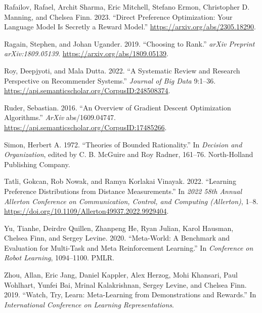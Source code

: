 \documentclass[
  letterpaper,
  DIV=11,
  numbers=noendperiod,
  oneside]{scrreprt}
\newlength{\cslhangindent}
\newenvironment{CSLReferences}[2] %
 {\begin{list}{}{%
  \setlength{\itemindent}{0pt}
  \setlength{\leftmargin}{0pt}
  \setlength{\parsep}{0pt}
  \ifodd #1
   \setlength{\leftmargin}{\cslhangindent}
   \setlength{\itemindent}{-1\cslhangindent}
  \fi
  \setlength{\itemsep}{#2\baselineskip}}}
 {\end{list}}
\theoremstyle{remark}
\begin{document}
\begin{CSLReferences}{1}{0}
Rafailov, Rafael, Archit Sharma, Eric Mitchell, Stefano Ermon,
Christopher D. Manning, and Chelsea Finn. 2023. {``Direct Preference
Optimization: Your Language Model Is Secretly a Reward Model.''}
\url{https://arxiv.org/abs/2305.18290}.

Ragain, Stephen, and Johan Ugander. 2019. {``Choosing to Rank.''}
\emph{arXiv Preprint arXiv:1809.05139}.
\url{https://arxiv.org/abs/1809.05139}.

Roy, Deepjyoti, and Mala Dutta. 2022. {``A Systematic Review and
Research Perspective on Recommender Systems.''} \emph{Journal of Big
Data} 9:1--36. \url{https://api.semanticscholar.org/CorpusID:248508374}.

Ruder, Sebastian. 2016. {``An Overview of Gradient Descent Optimization
Algorithms.''} \emph{ArXiv} abs/1609.04747.
\url{https://api.semanticscholar.org/CorpusID:17485266}.

Simon, Herbert A. 1972. {``Theories of Bounded Rationality.''} In
\emph{Decision and Organization}, edited by C. B. McGuire and Roy
Radner, 161--76. North-Holland Publishing Company.

Tatli, Gokcan, Rob Nowak, and Ramya Korlakai Vinayak. 2022. {``Learning
Preference Distributions from Distance Measurements.''} In \emph{2022
58th Annual Allerton Conference on Communication, Control, and Computing
(Allerton)}, 1--8.
\url{https://doi.org/10.1109/Allerton49937.2022.9929404}.

Yu, Tianhe, Deirdre Quillen, Zhanpeng He, Ryan Julian, Karol Hausman,
Chelsea Finn, and Sergey Levine. 2020. {``Meta-World: A Benchmark and
Evaluation for Multi-Task and Meta Reinforcement Learning.''} In
\emph{Conference on Robot Learning}, 1094--1100. PMLR.

Zhou, Allan, Eric Jang, Daniel Kappler, Alex Herzog, Mohi Khansari, Paul
Wohlhart, Yunfei Bai, Mrinal Kalakrishnan, Sergey Levine, and Chelsea
Finn. 2019. {``Watch, Try, Learn: Meta-Learning from Demonstrations and
Rewards.''} In \emph{International Conference on Learning
Representations}.

\end{CSLReferences}

\end{document}
